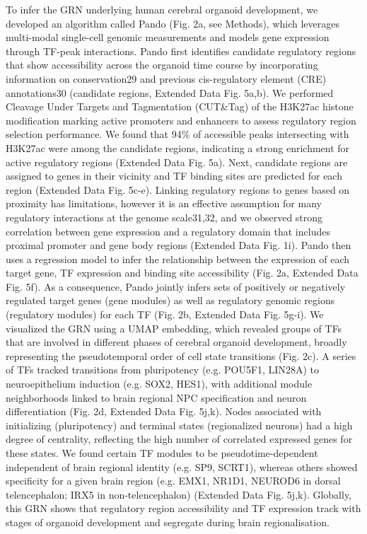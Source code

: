 To infer the GRN underlying human cerebral organoid development, we developed an algorithm called Pando (Fig. 2a, see Methods), which leverages multi-modal single-cell genomic measurements and models gene expression through TF-peak interactions. Pando first identifies candidate regulatory regions that show accessibility across the organoid time course by incorporating information on conservation29 and previous cis-regulatory element (CRE) annotations30 (candidate regions, Extended Data Fig. 5a,b). We performed Cleavage Under Targets and Tagmentation (CUT\&Tag) of the H3K27ac histone modification marking active promoters and enhancers to assess regulatory region selection performance. We found that 94\% of accessible peaks intersecting with H3K27ac were among the candidate regions, indicating a strong enrichment for active regulatory regions (Extended Data Fig. 5a). Next, candidate regions are assigned to genes in their vicinity and TF binding sites are predicted for each region (Extended Data Fig. 5c-e). Linking regulatory regions to genes based on proximity has limitations, however it is an effective assumption for many regulatory interactions at the genome scale31,32, and we observed strong correlation between gene expression and a regulatory domain that includes proximal promoter and gene body regions (Extended Data Fig. 1i). Pando then uses a regression model to infer the relationship between the expression of each target gene, TF expression and binding site accessibility (Fig. 2a, Extended Data Fig. 5f). As a consequence, Pando jointly infers sets of positively or negatively regulated target genes (gene modules) as well as regulatory genomic regions (regulatory modules) for each TF (Fig. 2b, Extended Data Fig. 5g-i). We visualized the GRN using a UMAP embedding, which revealed groups of TFs that are involved in different phases of cerebral organoid development, broadly representing the pseudotemporal order of cell state transitions (Fig. 2c). A series of TFs tracked transitions from pluripotency (e.g. POU5F1, LIN28A) to neuroepithelium induction (e.g. SOX2, HES1), with additional module neighborhoods linked to brain regional NPC specification and neuron differentiation (Fig. 2d, Extended Data Fig. 5j,k). Nodes associated with initializing (pluripotency) and terminal states (regionalized neurons) had a high degree of centrality, reflecting the high number of correlated expressed genes for these states. We found certain TF modules to be pseudotime-dependent independent of brain regional identity (e.g. SP9, SCRT1), whereas others showed specificity for a given brain region (e.g. EMX1, NR1D1, NEUROD6 in dorsal telencephalon; IRX5 in non-telencephalon) (Extended Data Fig. 5j,k). Globally, this GRN shows that regulatory region accessibility and TF expression track with stages of organoid development and segregate during brain regionalisation.

